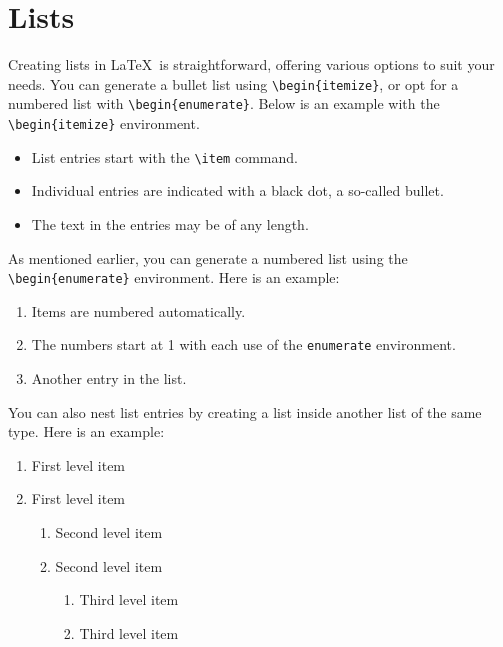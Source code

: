 \section{Lists}
Creating lists in \LaTeX\ is straightforward, offering various options to suit your needs. You can generate a bullet list using \verb|\begin{itemize}|, or opt for a numbered list with \verb|\begin{enumerate}|. Below is an example with the \verb|\begin{itemize}| environment.

\begin{itemize}
    \item List entries start with the \verb|\item| command.
    \item Individual entries are indicated with a black dot, a so-called bullet.
    \item The text in the entries may be of any length.
\end{itemize}

As mentioned earlier, you can generate a numbered list using the \verb|\begin{enumerate}| environment. Here is an example:

\begin{enumerate}
    \item Items are numbered automatically.
    \item The numbers start at 1 with each use of the \verb|enumerate| environment.
    \item Another entry in the list.
\end{enumerate}

You can also nest list entries by creating a list inside another list of the same type. Here is an example:

\begin{enumerate}
    \item First level item
    \item First level item
          \begin{enumerate}
              \item Second level item
              \item Second level item
                    \begin{enumerate}
                        \item Third level item
                        \item Third level item
                    \end{enumerate}
          \end{enumerate}
\end{enumerate}

